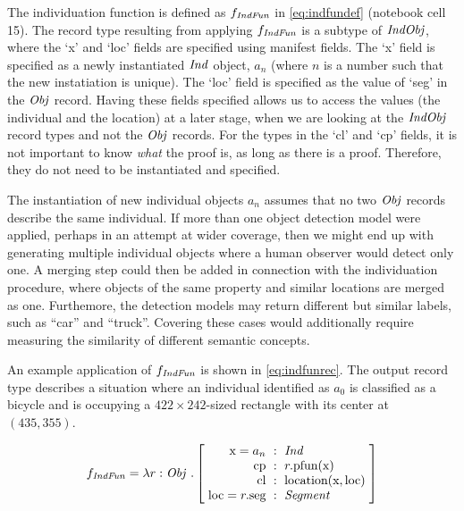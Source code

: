 The individuation function is defined as $f_{\mathit{IndFun}}$ in \autoref{eq:indfundef} (notebook cell 15).
The record type resulting from applying $f_{\mathit{IndFun}}$ is a subtype of $\mathit{IndObj}$, where the `x' and `loc' fields are specified using manifest fields.
The `x' field is specified as a newly instantiated $\mathit{Ind}$ object, $a_n$ (where $n$ is a number such that the new instatiation is unique).
The `loc' field is specified as the value of `seg' in the $\mathit{Obj}$ record.
Having these fields specified allows us to access the values (the individual and the location) at a later stage, when we are looking at the $\mathit{IndObj}$ record types and not the $\mathit{Obj}$ records.
For the types in the `cl' and `cp' fields, it is not important to know \textit{what} the proof is, as long as there is a proof.
Therefore, they do not need to be instantiated and specified.

The instantiation of new individual objects $a_n$ assumes that no two $\mathit{Obj}$ records describe the same individual.
If more than one object detection model were applied, perhaps in an attempt at wider coverage, then we might end up with generating multiple individual objects where a human observer would detect only one.
A merging step could then be added in connection with the individuation procedure, where objects of the same property and similar locations are merged as one.
Furthemore, the detection models may return different but similar labels, such as ``car'' and ``truck''.
Covering these cases would additionally require measuring the similarity of different semantic concepts.

An example application of $f_{\mathit{IndFun}}$ is shown in \autoref{eq:indfunrec}.
The output record type describes a situation where an individual identified as $a_0$ is classified as a bicycle and is occupying a $422 \times 242$-sized rectangle with its center at $(435, 355)$.

\begin{equation}\label{eq:indfundef}
f_\type{IndFun} = \lambda r : \type{Obj}\ . \rec{
    \text{x} = a_n &:& \type{Ind} \\
    \text{cp} &:& r.\text{pfun}(\text{x}) \\
    \text{cl} &:& \text{location}(\text{x}, \text{loc}) \\
    \text{loc} = r.\text{seg} &:& \type{Segment}\\
}
\end{equation}

